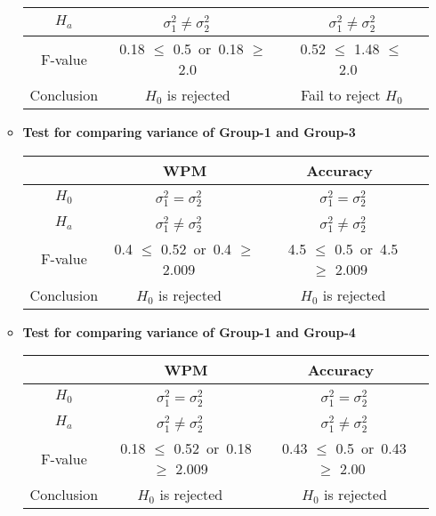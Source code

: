 \documentclass[12pt,a4paper]{report}
\begin{document}
\begin{enumerate}
\begin{itemize}
\begin{center}
\begin{tabular}{ |c|c|c|c|}
          $H_a$ & $\sigma_1^2  \neq \sigma_2^2$ \ & \ $\sigma_1^2  \neq \sigma_2^2$ \\
          \hline
          F-value &  0.18 $\leq$ 0.5\ or\  0.18 $\geq$ 2.0   \ & \ 0.52 $\leq$ 1.48 $\leq$ 2.0 \\
          \hline
          Conclusion & $H_0$ is rejected \ & \ Fail to reject $H_0$\\
          \hline
        \end{tabular}
        \end{center}
        \item \textbf{Test for comparing variance of Group-1 and Group-3}
        \begin{center}
        \begin{tabular}{ |c|c|c|c|}
          \hline
           & WPM & Accuracy \\
          \hline
          $H_0$ & $\sigma_1^2  = \sigma_2^2$ \ & \ $\sigma_1^2  = \sigma_2^2$ \\ 
          \hline
          $H_a$ & $\sigma_1^2  \neq \sigma_2^2$ \ & \ $\sigma_1^2  \neq \sigma_2^2$ \\
          \hline
          F-value &  0.4 $\leq$ 0.52\ or\  0.4 $\geq$ 2.009   \ & \ 4.5 $\leq$ 0.5\ or\  4.5 $\geq$ 2.009 \\
          \hline
          Conclusion & $H_0$ is rejected \ & \ $H_0$ is rejected\\
          \hline
        \end{tabular}
        \end{center}
        \item \textbf{Test for comparing variance of Group-1 and Group-4}
        \begin{center}
        \begin{tabular}{ |c|c|c|c|}
          \hline
           & WPM & Accuracy \\
          \hline
          $H_0$ & $\sigma_1^2  = \sigma_2^2$ \ & \ $\sigma_1^2  = \sigma_2^2$ \\ 
          \hline
          $H_a$ & $\sigma_1^2  \neq \sigma_2^2$ \ & \ $\sigma_1^2  \neq \sigma_2^2$ \\
          \hline
          F-value &  0.18 $\leq$ 0.52\ or\  0.18 $\geq$ 2.009   \ & \ 0.43 $\leq$ 0.5\ or\  0.43 $\geq$ 2.00 \\
          \hline
          Conclusion & $H_0$ is rejected \ & \ $H_0$ is rejected\\
          \hline
        \end{tabular}
        \end{center}

\end{itemize}
\end{enumerate}
\end{document}
